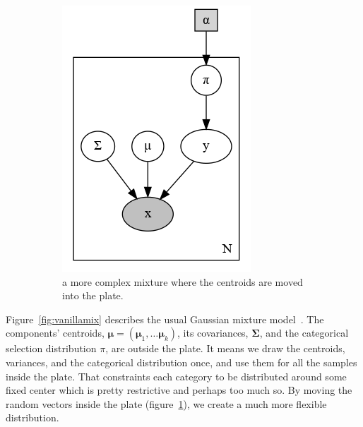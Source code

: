\documentclass[11pt, a4paper]{report}
\theoremstyle{plain}
\theoremstyle{definition}
\theoremstyle{remark}
\newcommand{\bv}[1]{\boldsymbol{#1}}
\begin{document}
\begin{figure}[h]
\begin{subfigure}[t]{0.4\textwidth}
\includegraphics[width=\textwidth]{plots/mmp.gv.png}
\caption{a more complex mixture where the centroids are moved into the plate.}
\label{fig:platemix}
\end{subfigure}
\caption{}
\label{fig:mixturemodels}
\end{figure}

Figure~\ref{fig:vanillamix} describes the usual Gaussian mixture
model~\cite{bishop2006pattern}. The components'
centroids, $\bv{\mu} = (\bv{\mu}_1, \dots \bv{\mu}_k)$, its covariances,
$\bv{\Sigma}$, 
and the categorical selection
distribution $\pi$, are outside the plate.
It means we draw the centroids, variances, and the categorical distribution
once, and use them for all the samples inside the plate.
That constraints each category to be
distributed around some fixed center which is pretty restrictive and perhaps too
much so. By moving the random vectors inside the plate
(figure~\ref{fig:platemix}), we create a much more flexible distribution.
\end{document}
